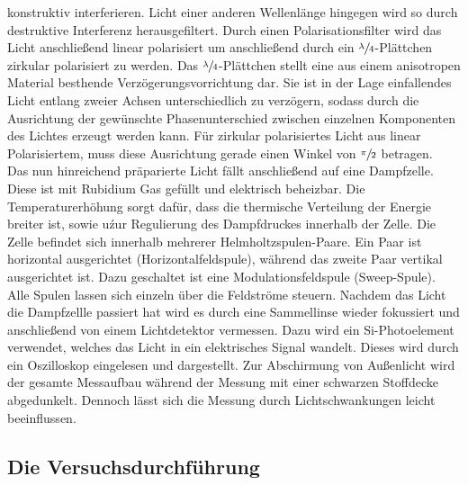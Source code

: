 {konstruktiv interferieren. Licht einer anderen Wellenlänge hingegen wird so durch destruktive Interferenz herausgefiltert. Durch einen Polarisationsfilter wird das Licht anschließend linear polarisiert um anschließend durch ein $\sfrac{\lambda}{4}$-Plättchen zirkular polarisiert zu werden. Das $\sfrac{\lambda}{4}$-Plättchen stellt eine aus einem anisotropen Material besthende Verzögerungsvorrichtung dar. Sie ist in der Lage einfallendes Licht entlang zweier Achsen unterschiedlich zu verzögern, sodass durch die Ausrichtung der gewünschte Phasenunterschied zwischen einzelnen Komponenten des Lichtes erzeugt werden kann. Für zirkular polarisiertes Licht aus linear Polarisiertem, muss diese Ausrichtung gerade einen Winkel von $\sfrac{\pi}{2}$ betragen. \\
Das nun hinreichend präparierte Licht fällt anschließend auf eine Dampfzelle. Diese ist mit Rubidium Gas gefüllt und elektrisch beheizbar. Die Temperaturerhöhung sorgt dafür, dass die thermische Verteilung der Energie breiter ist, sowie uźur Regulierung des Dampfdruckes innerhalb der Zelle. Die Zelle befindet sich innerhalb mehrerer Helmholtzspulen-Paare. Ein Paar ist horizontal ausgerichtet (Horizontalfeldspule), während das zweite Paar vertikal ausgerichtet ist. Dazu geschaltet ist eine Modulationsfeldspule (Sweep-Spule). Alle Spulen lassen sich einzeln über die Feldströme steuern. Nachdem das Licht die Dampfzellle passiert hat wird es durch eine Sammellinse wieder fokussiert und anschließend von einem Lichtdetektor vermessen. Dazu wird ein Si-Photoelement verwendet, welches das Licht in ein elektrisches Signal wandelt. Dieses wird durch ein Oszilloskop eingelesen und dargestellt. Zur Abschirmung von Außenlicht wird der gesamte Messaufbau während der Messung mit einer schwarzen Stoffdecke abgedunkelt. Dennoch lässt sich die Messung durch Lichtschwankungen leicht beeinflussen.

\subsection{Die Versuchsdurchführung}

}
